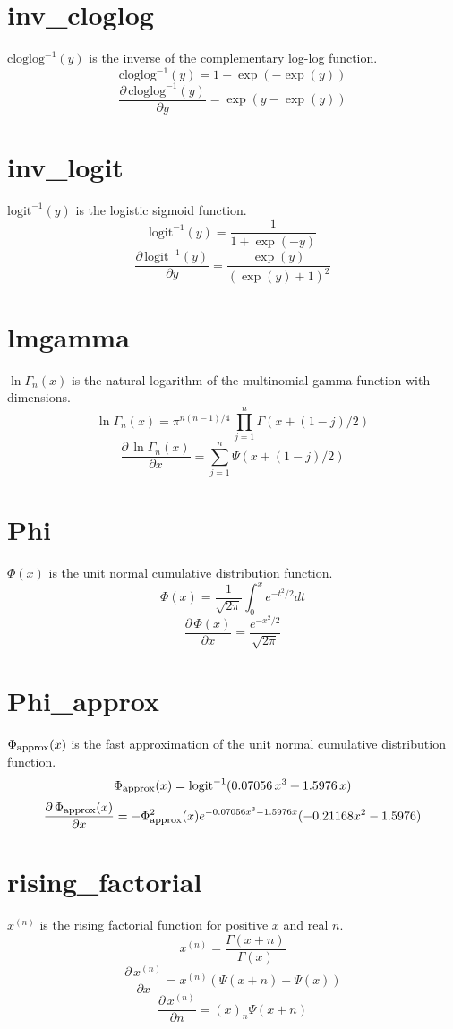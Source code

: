 \section{inv\_cloglog}\label{inv-cloglog-appendix.section}
$\mbox{cloglog}^{-1}(y)$ is 
the inverse of the complementary log-log function.
%
\[
\mbox{cloglog}^{-1}(y)= 1 - \exp \left( - \exp(y) \right)
\]
%
\[
\frac{\partial \, \mbox{cloglog}^{-1}(y)}{\partial y} = \exp(y-\exp(y))
\]

\section{inv\_logit}\label{inv-logit-appendix.section}
$\mbox{logit}^{-1}(y)$ is the logistic sigmoid function.
%
\[
\mbox{logit}^{-1}(y) = \frac{1}{1 + \exp(-y)}
\]
%
\[
\frac{\partial \, \mbox{logit}^{-1}(y)}{\partial y} = \frac{\exp(y)}{(\exp(y)+1)^2}
\]

\section{lmgamma}\label{lmgamma-appendix.section}
$\ln\Gamma_n(x)$ is the natural logarithm of the multinomial gamma function with 
dimensions.
%
\[
\ln\Gamma_n(x) = \pi^{n(n-1)/4} \, \prod_{j=1}^n \Gamma(x + (1 - j)/2)
\]
%
\[
\frac{\partial \, \ln\Gamma_n(x)}{\partial x} = \sum_{j=1}^n \Psi(x + (1 - j) / 2)
\]

\section{Phi}\label{Phi-appendix.section}
$\Phi(x)$ is the unit normal cumulative distribution function.
%
\[
\Phi(x) = \frac{1}{\sqrt{2\pi}} \int_{0}^{x} e^{-t^2/2} dt
\]
%
\[
\frac{\partial \, \Phi(x)}{\partial x} = \frac{e^{-x^2/2}}{\sqrt{2\pi}}
\]

\section{Phi\_approx}\label{Phi-approx-appendix.section}
$\Phi_{\mbox{\footnotesize approx}}(x)$ is the fast approximation of the 
unit normal cumulative distribution function.
%
\[
\Phi_{\mbox{\footnotesize approx}}(x) = \mbox{logit}^{-1}(0.07056 \,
x^3 + 1.5976 \, x)
\]
%
\[
\frac{\partial \, \Phi_{\mbox{\footnotesize approx}}(x)}{\partial x}
	= -\Phi_{\mbox{\footnotesize approx}}^2(x)
		e^{-0.07056x^3 - 1.5976x}(-0.21168x^2-1.5976)
\]

\section{rising\_factorial}\label{rising-factorial-appendix.section}
$x^{(n)}$ is the rising factorial function for positive $x$ and real $n$.
%
\[
x^{(n)}=\frac{\Gamma(x+n)}{\Gamma(x)}
\]
%
\[
\frac{\partial \, x^{(n)}}{\partial x} = x^{(n)}(\Psi(x+n)-\Psi(x))
\]
%
\[
\frac{\partial \, x^{(n)}}{\partial n} = (x)_n\Psi(x+n)
\]


